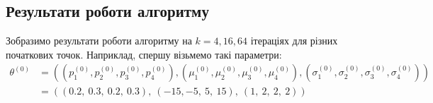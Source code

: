 \documentclass[a4paper,14pt]{extarticle} %
\numberwithin{equation}{section}
\begin{document}
\newpage
\subsection*{Результати роботи алгоритму}

Зобразимо результати роботи алгоритму на $k=4,16,64$ ітераціях для різних початкових точок. Наприклад, спершу візьмемо такі параметри: 
\begin{align*}
    \theta^{(0)} &= \left((p_1^{(0)},p_2^{(0)},p_3^{(0)},p_4^{(0)}), (\mu_1^{(0)},\mu_2^{(0)},\mu_3^{(0)},\mu_4^{(0)}), (\sigma_1^{(0)},\sigma_2^{(0)},\sigma_3^{(0)},\sigma_4^{(0)})\right) \\
    &=\left((0.2,\ 0.3,\ 0.2,\ 0.3),\ (-15, -5,\ 5,\ 15),\ (1,\ 2,\ 2,\ 2)\right)
\end{align*} 


\begin{figure}[H]
\end{figure}

\end{document}
